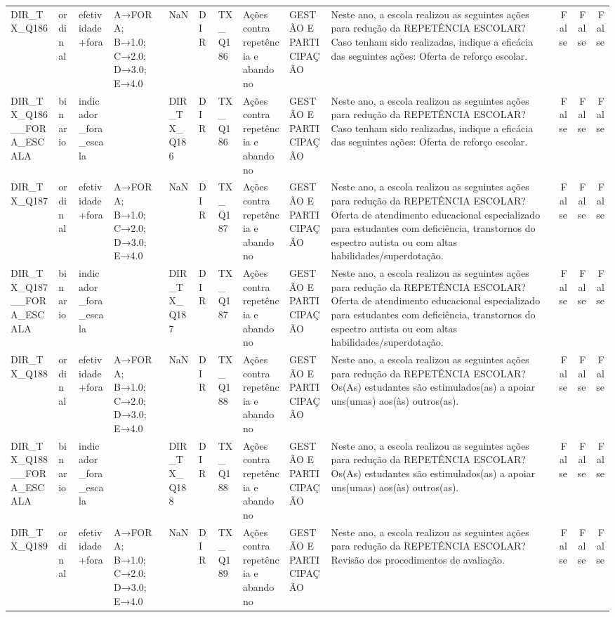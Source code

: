 \begin{tabular}{llllllllllrrr}
DIR\_TX\_Q186 & ordinal & efetividade+fora & A→FORA; B→1.0; C→2.0; D→3.0; E→4.0 & NaN & DIR & TX\_Q186 & Ações contra repetência e abandono & GESTÃO E PARTICIPAÇÃO & Neste ano, a escola realizou as seguintes ações para redução da REPETÊNCIA ESCOLAR? Caso tenham sido realizadas, indique a eficácia das seguintes ações: Oferta de reforço escolar. & False & False & False \\
DIR\_TX\_Q186\_\_FORA\_ESCALA & binario & indicador\_fora\_escala &  & DIR\_TX\_Q186 & DIR & TX\_Q186 & Ações contra repetência e abandono & GESTÃO E PARTICIPAÇÃO & Neste ano, a escola realizou as seguintes ações para redução da REPETÊNCIA ESCOLAR? Caso tenham sido realizadas, indique a eficácia das seguintes ações: Oferta de reforço escolar. & False & False & False \\
DIR\_TX\_Q187 & ordinal & efetividade+fora & A→FORA; B→1.0; C→2.0; D→3.0; E→4.0 & NaN & DIR & TX\_Q187 & Ações contra repetência e abandono & GESTÃO E PARTICIPAÇÃO & Neste ano, a escola realizou as seguintes ações para redução da REPETÊNCIA ESCOLAR?  Oferta de atendimento educacional especializado para estudantes com deficiência, transtornos do espectro autista ou com altas habilidades/superdotação. & False & False & False \\
DIR\_TX\_Q187\_\_FORA\_ESCALA & binario & indicador\_fora\_escala &  & DIR\_TX\_Q187 & DIR & TX\_Q187 & Ações contra repetência e abandono & GESTÃO E PARTICIPAÇÃO & Neste ano, a escola realizou as seguintes ações para redução da REPETÊNCIA ESCOLAR?  Oferta de atendimento educacional especializado para estudantes com deficiência, transtornos do espectro autista ou com altas habilidades/superdotação. & False & False & False \\
DIR\_TX\_Q188 & ordinal & efetividade+fora & A→FORA; B→1.0; C→2.0; D→3.0; E→4.0 & NaN & DIR & TX\_Q188 & Ações contra repetência e abandono & GESTÃO E PARTICIPAÇÃO & Neste ano, a escola realizou as seguintes ações para redução da REPETÊNCIA ESCOLAR? Os(As) estudantes são estimulados(as) a apoiar uns(umas) aos(às) outros(as). & False & False & False \\
DIR\_TX\_Q188\_\_FORA\_ESCALA & binario & indicador\_fora\_escala &  & DIR\_TX\_Q188 & DIR & TX\_Q188 & Ações contra repetência e abandono & GESTÃO E PARTICIPAÇÃO & Neste ano, a escola realizou as seguintes ações para redução da REPETÊNCIA ESCOLAR? Os(As) estudantes são estimulados(as) a apoiar uns(umas) aos(às) outros(as). & False & False & False \\
DIR\_TX\_Q189 & ordinal & efetividade+fora & A→FORA; B→1.0; C→2.0; D→3.0; E→4.0 & NaN & DIR & TX\_Q189 & Ações contra repetência e abandono & GESTÃO E PARTICIPAÇÃO & Neste ano, a escola realizou as seguintes ações para redução da REPETÊNCIA ESCOLAR? Revisão dos procedimentos de avaliação. & False & False & False \\

\end{tabular}
